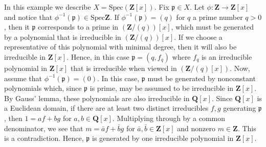 \begin{example}
\label{example-spec-Zx}
In this example we describe $X = \text{Spec} (\mathbf{Z}[x])$.
Fix $\mathfrak p \in X$.
Let $\phi: \mathbf{Z} \to \mathbf{Z}[x]$ and notice
that $\phi^{-1}(\mathfrak p) \in \text{Spec} \mathbf{Z}$.
If $\phi^{-1}(\mathfrak p) = (q)$ for $q$ a prime number $q > 0$,
then it $\mathfrak p$ corresponds to a prime in $(\mathbf{Z}/(q))[x]$,
which must be generated by a polynomial that is irreducible in
$(\mathbf{Z}/(q))[x]$.   If we choose a representative of this polynomial
with minimal degree, then it will also be irreducible in $\mathbf{Z}[x]$.
Hence, in this case $\mathfrak p = (q, f_q)$ where $f_q$ is an irreducible
polynomial in $\mathbf{Z}[x]$ that is irreducible when viewed
in $(\mathbf{Z}/(q) [x])$. Now, assume that $\phi^{-1}(\mathfrak p) = (0)$.
In this case, $\mathfrak p$ must be generated by nonconstant polynomials
which, since $\mathfrak p$ is prime, may be assumed to be irreducible in
$\mathbf{Z}[x]$.  By Gauss' lemma, these polynomials are also irreducible
in $\mathbf{Q}[x]$.  Since $\mathbf{Q}[x]$ is a Euclidean domain, if there
are at least two distinct irreducibles $f, g$ generating $\mathfrak p$,
then $1 = af + bg$ for $a, b \in \mathbf{Q}[x]$.  Multiplying through by
a common denominator, we see that $m = \bar{a}f + \bar{b} g$ for
$\bar{a}, \bar{b} \in \mathbf{Z}[x]$ and nonzero $m \in \mathbf{Z}$.
This is a contradiction.  Hence, $\mathfrak p$ is generated by one
irreducible polynomial in $\mathbf{Z}[x]$.
\end{example}

